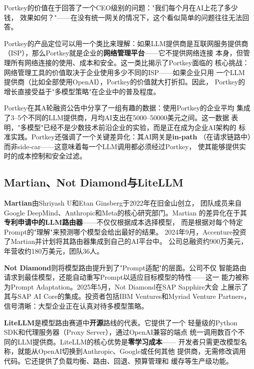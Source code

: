 Portkey的价值在于回答了一个CEO级别的问题："我们每个月在AI上花了多少钱，
效果如何？"——在没有统一网关的情况下，这个看似简单的问题往往无法回答。

Portkey的产品定位可以用一个类比来理解：如果LLM提供商是互联网服务提供商
（ISP），那么Portkey就是企业的\textbf{网络管理平台}——它不提供网络连接
本身，但管理所有网络连接的使用、成本和安全。这一类比揭示了Portkey面临的
核心挑战：网络管理工具的价值取决于企业使用多少不同的ISP——如果企业只用
一个LLM提供商（比如全部使用OpenAI），Portkey的价值就大打折扣。因此，
Portkey的增长直接受益于"多模型策略"在企业中的普及程度。

Portkey在其A轮融资公告中分享了一组有趣的数据：使用Portkey的企业平均
集成了3--5个不同的LLM提供商，月均AI支出在5000--50000美元之间。这一数据
表明，"多模型"已经不是少数技术前沿企业的实验，而是正在成为企业AI架构的
标准实践。Portkey还强调了一个关键差异化：其AI网关是\textbf{in-path}
（在请求链路中）而非side-car——这意味着每一个LLM调用都必须经过Portkey，
使其能够提供实时的成本控制和安全过滤。

\subsection{Martian、Not Diamond与LiteLLM}
\label{subsec:martian-notdiamond-litellm}

\textbf{Martian}由Shriyash U和Etan Ginsberg于2022年在旧金山创立，
团队成员来自Google DeepMind、Anthropic和Meta的核心研究部门。Martian
的差异化在于其\textbf{专利申请中的LLM路由器}——不仅仅根据成本选择模型，
而是根据对每个特定Prompt的"理解"来预测哪个模型会给出最好的结果。
2024年9月，Accenture投资了Martian并计划将其路由器集成到自己的AI平台中。
公司总融资约900万美元，年营收约180万美元，团队36人。

\textbf{Not Diamond}则将模型路由提升到了"Prompt适配"的层面。公司不仅
智能路由请求到最佳模型，还能自动重写Prompt以适应目标模型的特性——这一
能力被称为Prompt Adaptation。2025年5月，Not Diamond在SAP Sapphire大会
上展示了其与SAP AI Core的集成。投资者包括IBM Ventures和Myriad Venture
Partners，信号清晰：大型企业正在认真对待多模型策略。

\textbf{LiteLLM}是模型路由赛道中\textbf{开源}路线的代表。它提供了一个
轻量级的Python SDK和代理服务器（Proxy Server），通过OpenAI兼容的端点
统一调用数百个不同的LLM提供商。LiteLLM的核心优势是\textbf{零学习成本}——
开发者只需更改模型名称，就能从OpenAI切换到Anthropic、Google或任何其他
提供商，无需修改调用代码。它还提供了负载均衡、路由、回退、预算管理和
缓存等生产级功能。

